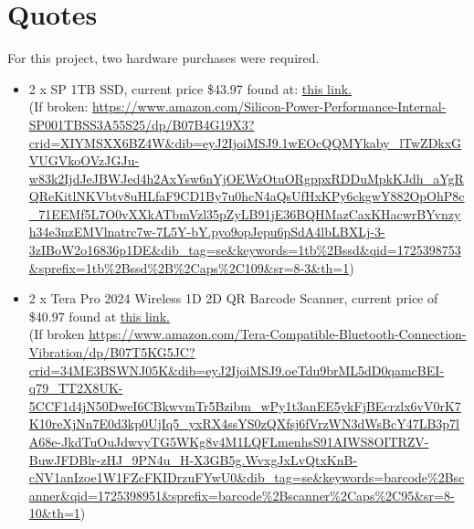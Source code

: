 \documentclass{article}
\begin{document}
\section{Quotes}
For this project, two hardware purchases were required.
\begin{itemize}
    \item 2 x SP 1TB SSD, current price \$43.97 found at: \href{https://www.amazon.com/Silicon-Power-Performance-Internal-SP001TBSS3A55S25/dp/B07B4G19X3?crid=XIYMSXX6BZ4W&dib=eyJ2IjoiMSJ9.1wEOcQQMYkaby\_lTwZDkxGVUGVkoOVzJGJu-w83k2IjdJeJBWJed4h2AxYsw6nYjOEWzOtuORgppxRDDuMpkKJdh_aYgRQReKitlNKVbtv8uHLfaF9CD1By7u0hcN4aQsUfHxKPy6ckgwY882OpOhP8c_71EEMf5L7O0vXXkATbmVzl35pZyLB91jE36BQHMazCaxKHacwrBYvnzyh34e3nzEMVlnatrc7w-7L5Y-bY.pyo9opJepu6pSdA4lbLBXLj-3-3zIBoW2o16836p1DE&dib\_tag=se&keywords=1tb\%2Bssd&qid=1725398753&sprefix=1tb\%2Bssd\%2B\%2Caps\%2C109&sr=8-3&th=1}{this link.}\\ (If broken: \url{https://www.amazon.com/Silicon-Power-Performance-Internal-SP001TBSS3A55S25/dp/B07B4G19X3?crid=XIYMSXX6BZ4W&dib=eyJ2IjoiMSJ9.1wEOcQQMYkaby\_lTwZDkxGVUGVkoOVzJGJu-w83k2IjdJeJBWJed4h2AxYsw6nYjOEWzOtuORgppxRDDuMpkKJdh_aYgRQReKitlNKVbtv8uHLfaF9CD1By7u0hcN4aQsUfHxKPy6ckgwY882OpOhP8c_71EEMf5L7O0vXXkATbmVzl35pZyLB91jE36BQHMazCaxKHacwrBYvnzyh34e3nzEMVlnatrc7w-7L5Y-bY.pyo9opJepu6pSdA4lbLBXLj-3-3zIBoW2o16836p1DE&dib\_tag=se&keywords=1tb\%2Bssd&qid=1725398753&sprefix=1tb\%2Bssd\%2B\%2Caps\%2C109&sr=8-3&th=1})
    \item 2 x Tera Pro 2024 Wireless 1D 2D QR Barcode Scanner, current price of \$40.97 found at \href{https://www.amazon.com/Tera-Compatible-Bluetooth-Connection-Vibration/dp/B07T5KG5JC?crid=34ME3BSWNJ05K&dib=eyJ2IjoiMSJ9.oeTdu9brML5dD0qamcBEI-q79_TT2X8UK-5CCF1d4jN50DweI6CBkwvmTr5Bzibm_wPy1t3anEE5ykFjBEcrzlx6vV0rK7K10reXjNn7E0d3kp0UjIq5_yxRX4ssYS0zQXfsj6fVrzWN3dWsBcY47LB3p7lA68e-JkdTuOuJdwvyTG5WKg8v4M1LQFLmenhsS91AIWS8OITRZV-BuwJFDBlr-zHJ_9PN4u_H-X3GB5g.WvxgJxLvQtxKnB-cNV1anIzoe1W1FZcFKIDrzuFYwU0&dib_tag=se&keywords=barcode\%2Bscanner&qid=1725398951&sprefix=barcode\%2Bscanner\%2Caps\%2C95&sr=8-10&th=1}{this link.} \\ (If broken \url{https://www.amazon.com/Tera-Compatible-Bluetooth-Connection-Vibration/dp/B07T5KG5JC?crid=34ME3BSWNJ05K&dib=eyJ2IjoiMSJ9.oeTdu9brML5dD0qamcBEI-q79_TT2X8UK-5CCF1d4jN50DweI6CBkwvmTr5Bzibm_wPy1t3anEE5ykFjBEcrzlx6vV0rK7K10reXjNn7E0d3kp0UjIq5_yxRX4ssYS0zQXfsj6fVrzWN3dWsBcY47LB3p7lA68e-JkdTuOuJdwvyTG5WKg8v4M1LQFLmenhsS91AIWS8OITRZV-BuwJFDBlr-zHJ_9PN4u_H-X3GB5g.WvxgJxLvQtxKnB-cNV1anIzoe1W1FZcFKIDrzuFYwU0&dib_tag=se&keywords=barcode\%2Bscanner&qid=1725398951&sprefix=barcode\%2Bscanner\%2Caps\%2C95&sr=8-10&th=1})
\end{itemize}
\end{document}

